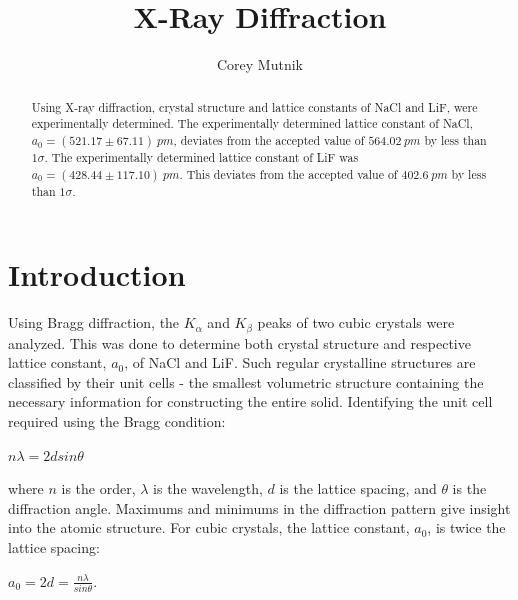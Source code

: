 \documentclass[aps,prl,twocolumn,superscriptaddress]{revtex4-1}
\begin{document}
\title{X-Ray Diffraction}


\author{Corey Mutnik}




\begin{abstract}

Using X-ray diffraction, crystal structure and lattice constants of NaCl and LiF, were experimentally determined.  The experimentally determined lattice constant of NaCl, $a_{0}=(521.17\pm67.11)~pm$, deviates from the accepted value of $564.02~pm$ by less than $1\sigma$.  The experimentally determined lattice constant of LiF was $a_{0}=(428.44\pm117.10)~pm$.  This deviates from the accepted value of $402.6~pm$ by less than $1\sigma$. 




\end{abstract}

\maketitle    



\section{Introduction}


Using Bragg diffraction, the $K_{\alpha}$ and $K_{\beta}$ peaks of two cubic crystals were analyzed.  This was done to determine both crystal structure and respective lattice constant, $a_{0}$, of NaCl and LiF.  Such regular crystalline structures are classified by their unit cells - the smallest volumetric structure containing the necessary information for constructing the entire solid.  Identifying the unit cell required using the Bragg condition:
\begin{center}
	$n\lambda = 2d sin\theta$
\end{center}
where $n$ is the order, $\lambda$ is the wavelength, $d$ is the lattice spacing, 
and $\theta$ is the diffraction angle.  Maximums and minimums in the diffraction pattern give insight into the atomic structure.  For cubic crystals, the lattice constant, $a_{0}$, is twice the lattice spacing:
\begin{center}
	$a_{0}=2d=\frac{n\lambda}{sin\theta}$.
\end{center}
 
\end{document}
